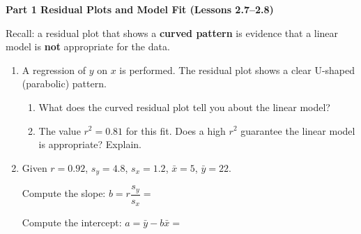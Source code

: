 \documentclass[10pt]{article}
\begin{document}
\namedateperiod

\vspace{0.3in}

{\large\bfseries\color{navy} Part 1 \quad Residual Plots and Model Fit (Lessons 2.7--2.8)}

\vspace{0.12in}
\noindent Recall: a residual plot that shows a \textbf{curved pattern} is evidence that a
linear model is \textbf{not} appropriate for the data.

\vspace{0.1in}

\begin{enumerate}[leftmargin=1.6em, itemsep=0.22in]

  \item A regression of $y$ on $x$ is performed. The residual plot shows a clear U-shaped
        (parabolic) pattern.

        \begin{enumerate}[label=\textbf{(\alph*)}, leftmargin=1.6em, itemsep=8pt]
          \item What does the curved residual plot tell you about the linear model?\\[8pt]

          \item The value $r^2 = 0.81$ for this fit. Does a high $r^2$ guarantee the linear
                model is appropriate? Explain.\\[8pt]
        \end{enumerate}

  \item Given $r = 0.92$, $s_y = 4.8$, $s_x = 1.2$, $\bar{x} = 5$, $\bar{y} = 22$.

        \vspace{4pt}
        Compute the slope: $b = r\dfrac{s_y}{s_x} = $ 

        \vspace{6pt}
        Compute the intercept: $a = \bar{y} - b\bar{x} = $ 

\end{enumerate}
\end{document}
